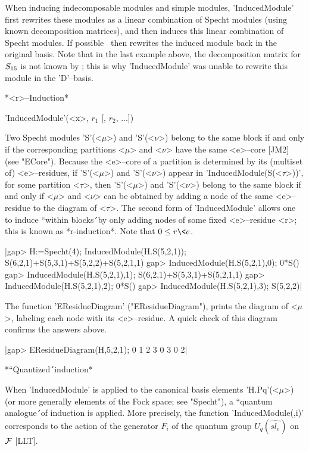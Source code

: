 When inducing indecomposable modules and simple modules, 'InducedModule' 
first rewrites these modules as a linear combination of Specht modules 
(using known decomposition matrices), and then induces this linear 
combination of Specht modules. If possible \Specht\ then rewrites the 
induced module back in the original basis. Note that in the last example 
above, the decomposition matrix for $S_{15}$ is not known by \Specht; 
this is why 'InducedModule' was unable to rewrite this module in the 
'D'--basis.

\medskip

*<r>--Induction*

'InducedModule'(<x>, $r_1$ [, $r_2$, ...])

Two Specht modules 'S'(<$\mu$>) and 'S'(<$\nu$>) belong to the same block 
if and only if the corresponding partitions <$\mu$> and <$\nu$> have the 
same <e>--core [JM2]  (see "ECore"). Because the <e>--core of a partition 
is determined by its (multiset of) <e>--residues, if 'S'(<$\mu$>) and 
'S'(<$\nu$>) appear in 'InducedModule(S(<$\tau$>))', for some partition 
<$\tau$>, then 'S'(<$\mu$>) and 'S'(<$\nu$>) belong to the same block if 
and only if <$\mu$> and <$\nu$> can be obtained by adding a node of the 
same <e>--residue to the diagram of <$\tau$>. The second form of 
'InducedModule' allows one to induce ``within blocks\'\'\ by only adding 
nodes of some fixed <e>--residue <r>; this is known as *r-induction*. Note
that $0\le r\<e$.

|gap> H:=Specht(4); InducedModule(H.S(5,2,1));
S(6,2,1)+S(5,3,1)+S(5,2,2)+S(5,2,1,1)
gap> InducedModule(H.S(5,2,1),0);
0*S()
gap> InducedModule(H.S(5,2,1),1);
S(6,2,1)+S(5,3,1)+S(5,2,1,1)
gap> InducedModule(H.S(5,2,1),2);
0*S()
gap> InducedModule(H.S(5,2,1),3);
S(5,2,2)|

The function 'EResidueDiagram' ("EResidueDiagram"), prints the diagram 
of <$\mu$>, labeling each node with its <e>--residue. A quick check of 
this diagram confirms the answers above.

|gap> EResidueDiagram(H,5,2,1);
  0  1  2  3  0
  3  0
  2|

\medskip

*``Quantized\'\'\ induction*

When 'InducedModule' is applied to the canonical basis elements 
'H.Pq'(<$\mu$>) (or more generally elements of the Fock space; see 
"Specht"), a ``quantum analogue\'\'\ of induction is applied. More
precisely, the function 'InducedModule(\*,i)' corresponds to the
action of the generator $F_i$ of the quantum group
$U_q(\widehat{sl_e})$ on ${\cal F}$ [LLT]. 

